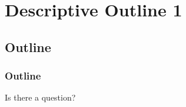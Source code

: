 \documentclass[
    aspectratio=169
]{beamer}
\begin{document}
\section{Descriptive Outline 1}
\subsection{Outline}
\begin{frame}
\frametitle{Outline}

\bcquestion Is there a question?

\end{frame}
\end{document}
